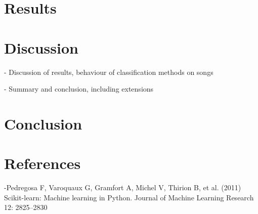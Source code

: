 \documentclass{article}
\begin{document}
\section{Results}

\section{Discussion}
- Discussion of results, behaviour of classification methods on songs

- Summary and conclusion, including extensions
\section{Conclusion}

\section{References}
-Pedregosa F, Varoquaux G, Gramfort A, Michel V, Thirion B, et al. (2011) Scikit-learn: Machine
learning in Python. Journal of Machine Learning Research 12: 2825–2830
\end{document}
